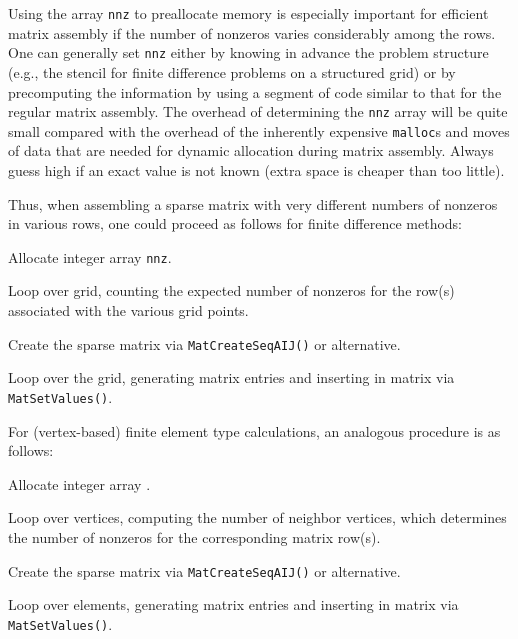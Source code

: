 Using the array \lstinline{nnz} to preallocate memory is especially
important for efficient matrix assembly if the number of nonzeros
varies considerably among the rows.  One can generally set \lstinline{nnz}
either by knowing in advance the problem structure (e.g., the stencil
for finite difference problems on a structured grid) or by
precomputing the information by using a segment of code similar to
that for the regular matrix assembly.  The overhead of determining the
\lstinline{nnz} array will be quite small compared with the overhead of the
inherently expensive \lstinline{malloc}s and moves of data that are needed for
dynamic allocation during matrix assembly. Always guess high if an exact
value is not known (extra space is cheaper than too little).

Thus, when assembling a sparse matrix with very different
numbers of nonzeros in various rows, one could proceed
as follows for finite difference methods:
\begin{tightenumerate}
\item Allocate integer array \lstinline{nnz}.
\item Loop over grid, counting the expected number of nonzeros for the row(s)
associated with the various grid points.
\item Create the sparse matrix via \lstinline{MatCreateSeqAIJ()} or alternative.
\item Loop over the grid, generating matrix entries and inserting
    in matrix via \lstinline{MatSetValues()}.
\end{tightenumerate}
For (vertex-based) finite element type calculations, an analogous procedure is as follows:
\begin{tightenumerate}
\item Allocate integer array .
\item Loop over vertices, computing the number of neighbor vertices, which determines the
 number of nonzeros for the corresponding matrix row(s).
\item Create the sparse matrix via \lstinline{MatCreateSeqAIJ()} or alternative.
\item Loop over elements, generating matrix entries and inserting
      in matrix via \lstinline{MatSetValues()}.
\end{tightenumerate}

